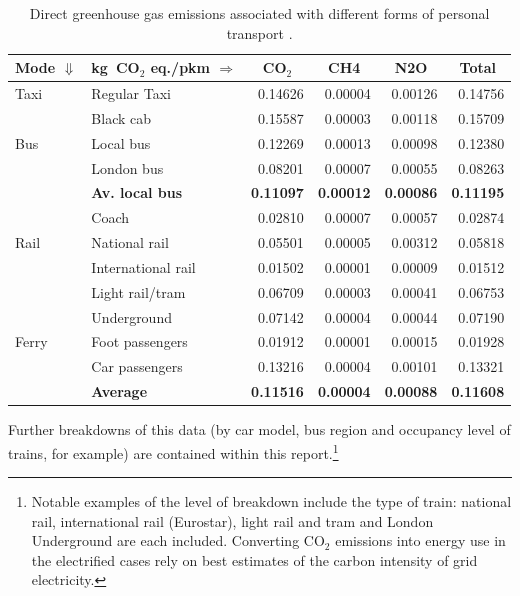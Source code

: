 \documentclass[a4paper, 11pt, twoside]{Thesis}
\begin{document}
\begin{table}[htbp]
\caption[Direct greenhouse gas emissions by mode]{Direct greenhouse gas
emissions associated with different forms of
personal transport \citep{Defra2011}.}
\begin{tabular}{llrrrr}
\toprule
\multicolumn{1}{c}{Mode $\Downarrow$} & \multicolumn{1}{c}{\textbf{kg~CO$_2$
eq./pkm $\Rightarrow$}} & \multicolumn{1}{c}{\textbf{CO$_2$}} &
\multicolumn{1}{c}{\textbf{CH4}} & \multicolumn{1}{c}{\textbf{N2O}} &
\multicolumn{1}{c}{\textbf{Total}} \\
\midrule
Taxi & Regular Taxi  & 0.14626 & 0.00004 & 0.00126 & 0.14756 \\
 & Black cab & 0.15587 & 0.00003 & 0.00118 & 0.15709 \\
Bus & Local bus  & 0.12269 & 0.00013 & 0.00098 & 0.12380 \\
 & London bus & 0.08201 & 0.00007 & 0.00055 & 0.08263 \\
 & \textbf{Av. local bus} & \textbf{0.11097} & \textbf{0.00012} &
\textbf{0.00086} & \textbf{0.11195} \\
 & Coach & 0.02810 & 0.00007 & 0.00057 & 0.02874 \\
Rail & National rail & 0.05501 & 0.00005 & 0.00312 & 0.05818 \\
 & International rail  & 0.01502 & 0.00001 & 0.00009 & 0.01512 \\
 & Light rail/tram & 0.06709 & 0.00003 & 0.00041 & 0.06753 \\
 & Underground & 0.07142 & 0.00004 & 0.00044 & 0.07190 \\
Ferry & Foot passengers & 0.01912 & 0.00001 & 0.00015 & 0.01928 \\
 & Car passengers & 0.13216 & 0.00004 & 0.00101 & 0.13321 \\
 & \textbf{Average} & \textbf{0.11516} & \textbf{0.00004} & \textbf{0.00088} &
\textbf{0.11608} \\
 \bottomrule
\end{tabular}
\label{tghgfactors}
\end{table}

Further breakdowns of this data (by car model, bus region and
occupancy level of trains, for example) are contained within 
this report.\footnote{Notable
examples of the level of breakdown include the type of train: national rail,
international rail (Eurostar), light rail and tram and London Underground
are each included. Converting CO$_2$ emissions into energy use in the
electrified cases rely on best estimates of the carbon intensity of grid
electricity.
}
\end{document}
